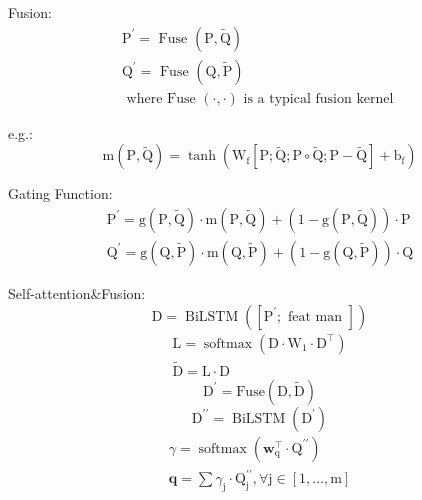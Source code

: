 \documentclass[a4paper,UTF8]{article}
\numberwithin{equation}{section}
\begin{document}
Fusion:
\begin{equation}
\begin{array}{c}{\mathrm{P}^{\prime}=\text { Fuse }(\mathrm{P}, \tilde{\mathrm{Q}})} \\ {\mathrm{Q}^{\prime}=\text { Fuse }(\mathrm{Q}, \tilde{\mathrm{P}})} \\ {\text { where Fuse }(\cdot, \cdot) \text { is a typical fusion kernel }}\end{array}
\end{equation}

e.g.:
\begin{equation}
	\mathrm{m}(\mathrm{P}, \tilde{\mathrm{Q}})=\tanh \left(\mathrm{W}_{\mathrm{f}}[\mathrm{P} ; \tilde{\mathrm{Q}} ; \mathrm{P} \circ \tilde{\mathrm{Q}} ; \mathrm{P}-\tilde{\mathrm{Q}}]+\mathrm{b}_{\mathrm{f}}\right)
	\end{equation}

Gating Function:
\begin{equation}
\begin{array}{l}{\mathrm{P}^{\prime}=\mathrm{g}(\mathrm{P}, \tilde{\mathrm{Q}}) \cdot \mathrm{m}(\mathrm{P}, \tilde{\mathrm{Q}})+(1-\mathrm{g}(\mathrm{P}, \tilde{\mathrm{Q}})) \cdot \mathrm{P}} \\ {\mathrm{Q}^{\prime}=\mathrm{g}(\mathrm{Q}, \tilde{\mathrm{P}}) \cdot \mathrm{m}(\mathrm{Q}, \tilde{\mathrm{P}})+(1-\mathrm{g}(\mathrm{Q}, \tilde{\mathrm{P}})) \cdot \mathrm{Q}}\end{array}
\end{equation}

Self-attention\&Fusion:
\begin{equation}
	\mathrm{D}=\operatorname{BiLSTM}\left(\left[\mathrm{P}^{\prime} ; \text { feat man }\right]\right)
	\end{equation}
	\begin{equation}
	\begin{array}{c}{\mathrm{L}=\operatorname{softmax}\left(\mathrm{D} \cdot \mathrm{W}_{1} \cdot \mathrm{D}^{\top}\right)} \\ {\tilde{\mathrm{D}}=\mathrm{L} \cdot \mathrm{D}}\end{array}
	\end{equation}
	\begin{equation}
		\mathrm{D}^{\prime}=\mathrm{Fuse}(\mathrm{D}, \tilde{\mathrm{D}})
		\end{equation}
		\begin{equation}
			\mathrm{D}^{\prime \prime}=\operatorname{BiLSTM}\left(\mathrm{D}^{\prime}\right)
			\end{equation}
			\begin{equation}
			\begin{array}{c}{\gamma=\operatorname{softmax}\left(\mathbf{w}_{\mathrm{q}}^{\top} \cdot \mathrm{Q}^{\prime \prime}\right)} \\ {\mathbf{q}=\sum \gamma_{\mathrm{j}} \cdot \mathrm{Q}_{\mathrm{j}}^{\prime \prime}, \forall \mathrm{j} \in[1, \ldots, \mathrm{m}]}\end{array}
			\end{equation}
\end{document}
